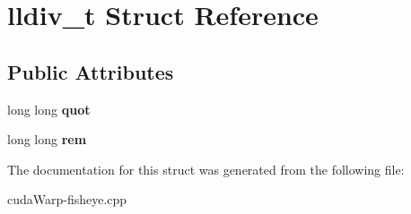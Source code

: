 \hypertarget{structlldiv__t}{}\section{lldiv\+\_\+t Struct Reference}
\label{structlldiv__t}
\subsection*{Public Attributes}
\begin{DoxyCompactItemize}
\item 
long long {\bfseries quot}\hypertarget{structlldiv__t_ae4d4bccdf22f41e052073f5790c5ec37}{}\label{structlldiv__t_ae4d4bccdf22f41e052073f5790c5ec37}

\item 
long long {\bfseries rem}\hypertarget{structlldiv__t_a32d4596a917aa9b496c8a49178a0e3c6}{}\label{structlldiv__t_a32d4596a917aa9b496c8a49178a0e3c6}

\end{DoxyCompactItemize}


The documentation for this struct was generated from the following file\+:\begin{DoxyCompactItemize}
\item 
cuda\+Warp-\/fisheye.\+cpp\end{DoxyCompactItemize}
